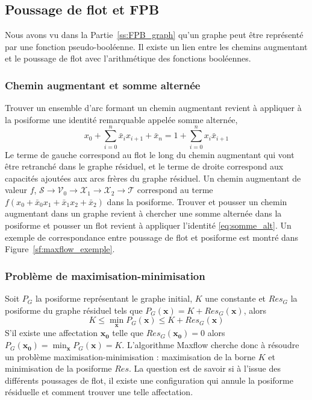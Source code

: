 \documentclass[../main/These_Mathias_Paget.tex]{subfiles}
\begin{document}
\subsection{Poussage de flot et FPB}
\label{ss:flow_FPB}

Nous avons vu dans la Partie~\ref{ss:FPB_graph} qu'un graphe peut être représenté par une fonction pseudo-booléenne. Il existe un lien entre les chemins augmentant et le poussage de flot avec l'arithmétique des fonctions booléennes. 

\subsubsection{Chemin augmentant et somme alternée}

Trouver un ensemble d'arc formant un chemin augmentant revient à appliquer à la posiforme une identité remarquable appelée somme alternée,
	\begin{equation}
			x_0 + \sum_{i=0}^{n}{\bar{x}_ix_{i+1}} + \bar{x}_n =
			 1 + \sum_{i=0}^{n}{x_i\bar{x}_{i+1}}
		\label{eq:somme_alt}
	\end{equation}
Le terme de gauche correspond au flot le long du chemin augmentant qui vont être retranché dans le graphe résiduel, et le terme de droite correspond aux capacités ajoutées aux arcs frères du graphe résiduel. Un chemin augmentant de valeur $f$, $\mathcal{S} \rightarrow \mathcal{V}_0 \rightarrow \mathcal{X}_1 \rightarrow \mathcal{X}_2 \rightarrow \mathcal{T}$ correspond au terme $f( x_0 + \bar{x}_0x_1 + \bar{x}_1x_2 + \bar{x}_2)$ dans la posiforme. Trouver et pousser un chemin augmentant dans un graphe revient à chercher une somme alternée dans la posiforme et pousser un flot revient à appliquer l'identité \ref{eq:somme_alt}. Un exemple de correspondance entre poussage de flot et posiforme est montré dans Figure~\ref{sf:maxflow_exemple}.
	
\subsubsection{Problème de maximisation-minimisation}
	\label{sss:min_max}
	Soit $P_G$ la posiforme représentant le graphe initial, $K$ une constante et $Res_G$ la posiforme du graphe résiduel tels que $P_G(\boldsymbol{x})=K+Res_G(\boldsymbol{x})$, alors
	\begin{equation}
		\label{min_max_sousmod}
			K \leq \min_{\boldsymbol{x}}{P_G(\boldsymbol{x})} \leq K + Res_G(\boldsymbol{x})
		\end{equation}
S'il existe une affectation $\boldsymbol{x_0}$ telle que $Res_G(\boldsymbol{x_0})=0$ alors $P_G(\boldsymbol{x_0})=\min_{\boldsymbol{x}}{P_G(\boldsymbol{x})}=K$. L'algorithme Maxflow cherche donc à résoudre un problème maximisation-minimisation : maximisation de la borne $K$ et minimisation de la posiforme $Res$. La question est de savoir si à l'issue des différents poussages de flot, il existe une configuration qui annule la posiforme résiduelle et comment trouver une telle affectation.
	
\end{document}

